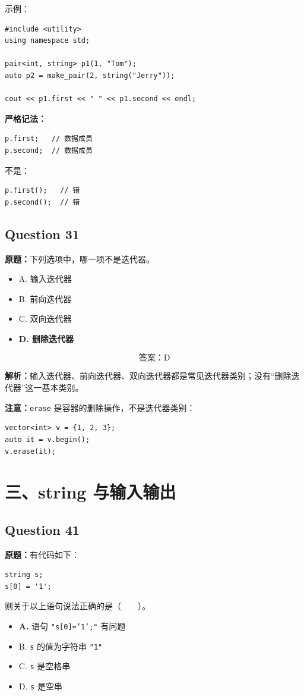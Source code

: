 \documentclass[11pt, a4paper]{article}
\begin{document}
示例：
\begin{lstlisting}
#include <utility>
using namespace std;

pair<int, string> p1(1, "Tom");
auto p2 = make_pair(2, string("Jerry"));

cout << p1.first << " " << p1.second << endl;
\end{lstlisting}

\textbf{严格记法：}
\begin{lstlisting}
p.first;   // 数据成员
p.second;  // 数据成员
\end{lstlisting}
不是：
\begin{lstlisting}
p.first();   // 错
p.second();  // 错
\end{lstlisting}


\subsection*{Question 31}
\textbf{原题：}下列选项中，哪一项不是迭代器。
\begin{itemize}
    \item A. 输入迭代器
    \item B. 前向迭代器
    \item C. 双向迭代器
    \item \textbf{D. 删除迭代器}
\end{itemize}

\[
\boxed{\text{答案：D}}
\]

\textbf{解析：}输入迭代器、前向迭代器、双向迭代器都是常见迭代器类别；没有“删除迭代器”这一基本类别。

\textbf{注意：}\texttt{erase} 是容器的删除操作，不是迭代器类别：
\begin{lstlisting}
vector<int> v = {1, 2, 3};
auto it = v.begin();
v.erase(it);
\end{lstlisting}


\section*{三、string 与输入输出}

\subsection*{Question 41}
\textbf{原题：}有代码如下：
\begin{lstlisting}
string s;
s[0] = '1';
\end{lstlisting}
则关于以上语句说法正确的是（~~~~）。
\begin{itemize}
    \item \textbf{A.} 语句 \texttt{"s[0]='1';"} 有问题
    \item B. \texttt{s} 的值为字符串 \texttt{"1"}
    \item C. \texttt{s} 是空格串
    \item D. \texttt{s} 是空串
\end{itemize}
\end{document}
